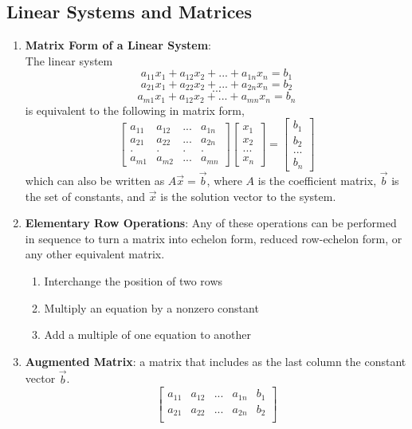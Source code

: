 \documentclass[10pt]{article}
\begin{document}
\subsection{Linear Systems and Matrices}
\begin{enumerate}
\item \textbf{Matrix Form of a Linear System}: \\
The linear system
$$a_{11}x_1 + a_{12}x_2 + ... + a_{1n}x_n = b_1$$
$$a_{21}x_1 + a_{22}x_2 + ... + a_{2n}x_n = b_2$$
$$...$$
$$a_{m1}x_1 + a_{12}x_2 + ... + a_{mn}x_n = b_n$$
is equivalent to the following in matrix form,
$$\begin{bmatrix}
a_{11} & a_{12} & ... & a_{1n} \\
a_{21} & a_{22} & ... & a_{2n} \\
. & . & . & . \\
a_{m1} & a_{m2} & ... & a_{mn} 
\end{bmatrix}
\begin{bmatrix}
x_1\\ x_2\\ ...\\ x_n
\end{bmatrix}
=
\begin{bmatrix}
b_1\\ b_2\\ ...\\ b_n
\end{bmatrix}$$
which can also be written as $A \vec{x} = \vec{b}$, where $A$ is the coefficient matrix, $\vec{b}$ is the set of constants, and $\vec{x}$ is the solution vector to the system.
\item \textbf{Elementary Row Operations}: Any of these operations can be performed in sequence to turn a matrix into echelon form, reduced row-echelon form, or any other equivalent matrix.
\begin{enumerate}
\item Interchange the position of two rows
\item Multiply an equation by a nonzero constant
\item Add a multiple of one equation to another
\end{enumerate}
\item \textbf{Augmented Matrix}: a matrix that includes as the last column the constant vector $\vec{b}$.
$$\begin{bmatrix}
a_{11} & a_{12} & ... & a_{1n} & b_1 \\
a_{21} & a_{22} & ... & a_{2n} & b_2 \\

\end{bmatrix}$$
\end{enumerate}
\end{document}

